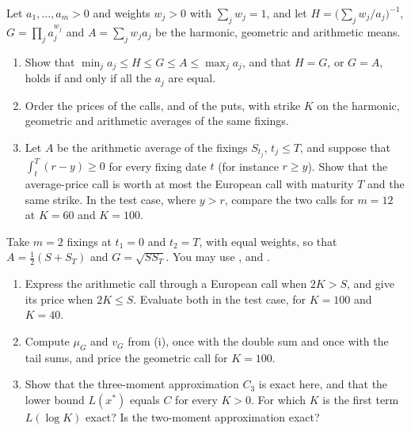 
\begin{exercise}[Means]\label{ex:as-means}
\easy Let $a_1,\dots,a_m>0$ and weights $w_j>0$ with $\sum_jw_j=1$, and let
$H=\big(\sum_jw_j/a_j\big)^{-1}$, $G=\prod_ja_j^{w_j}$ and $A=\sum_jw_ja_j$ be the harmonic,
geometric and arithmetic means.
\begin{enumerate}[label=(\alph*)]
  \item Show that $\min_ja_j\le H\le G\le A\le\max_ja_j$, and that $H=G$, or $G=A$, holds if and
    only if all the $a_j$ are equal.
  \item Order the prices of the calls, and of the puts, with strike $K$ on the harmonic, geometric
    and arithmetic averages of the same fixings.
  \item Let $A$ be the arithmetic average of the fixings $S_{t_j}$, $t_j\le T$, and suppose that
    $\int_t^T(r-y)\ge0$ for every fixing date $t$ (for instance $r\ge y$). Show that the
    average-price call is worth at most the European call with maturity $T$ and the same
    strike. In the test case, where $y>r$, compare the two calls for $m=12$ at $K=60$ and $K=100$.
\end{enumerate}
\end{exercise}

\begin{exercise}\label{ex:as-two-fixings}
\easy Take $m=2$ fixings at $t_1=0$ and $t_2=T$, with equal weights, so that $A=\frac12(S+S_T)$
and $G=\sqrt{SS_T}$. You may use , 
and .
\begin{enumerate}[label=(\alph*)]
  \item Express the arithmetic call through a European call when $2K>S$, and give its price when
    $2K\le S$. Evaluate both in the test case, for $K=100$ and $K=40$.
  \item Compute $\mu_G$ and $v_G$ from (i), once with the double sum
    and once with the tail sums, and price the geometric call for $K=100$.
  \item Show that the three-moment approximation $C_3$ is exact here, and that the lower bound
    $L(x^*)$ equals $C$ for every $K>0$. For which $K$ is the first term $L(\log K)$ exact? Is
    the two-moment approximation exact?
\end{enumerate}
\end{exercise}

